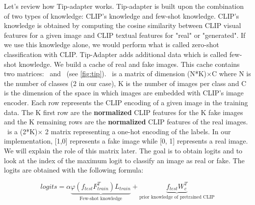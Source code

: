 \documentclass[12pt,a4paper]{article}
\begin{document}
Let's review how Tip-adapter works. Tip-adapter is built upon the combination of two types of knowledge: CLIP's knowledge and few-shot knowledge. CLIP's knowledge is obtained by computing the cosine similarity between CLIP visual features for a given image and CLIP textual features for "real" or "generated". If we use this knowledge alone, we would perform what is called zero-shot classification with CLIP. Tip-Adapter adds additional data which is called few-shot knowledge. We build a cache of real and fake images. This cache contains two matrices: \ft\ and \lt\ (see \autoref*{fig:tip}). \ft\ is a matrix of dimension (N*K)$\times$C where N is the number of classes (2 in our case), K is the number of images per class and C is the dimension of the space in which images are embedded with CLIP's image encoder. Each row represents the CLIP encoding of a given image in the training data. The K first row are the \textbf{normalized} CLIP features for the K fake images and the K remaining rows are the \textbf{normalized} CLIP features of the real images. \lt\ is a (2*K)$\times$ 2 matrix representing a one-hot encoding of the labels. In our implementation, [1,0] represents a fake image while [0, 1] represents a real image. We will explain the role of this matrix later. The goal is to obtain logits and to look at the index of the maximum logit to classify an image as real or fake. The logits are obtained with the following formula:

\begin{equation}
    logits = \alpha\underbrace{\varphi(f_{test}F_{train}^T)L_{train}}_{\text{Few-shot knowledge}} + \underbrace{f_{test}W_c^T}_{\text{prior knowledge of pretrained CLIP}} \nonumber
\end{equation}
\end{document}
